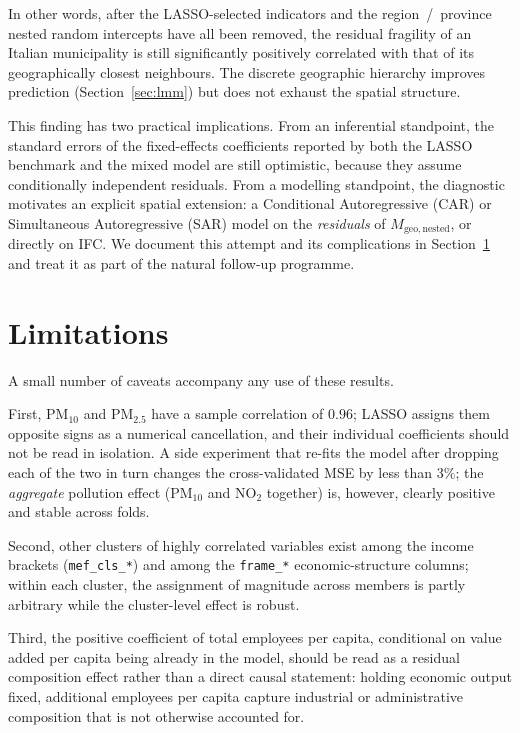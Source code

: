 \documentclass[11pt,a4paper]{article}
\begin{document}
In other words, after the LASSO-selected indicators and the
region~/~province nested random intercepts have all been removed, the
residual fragility of an Italian municipality is still significantly
positively correlated with that of its geographically closest
neighbours. The discrete geographic hierarchy improves prediction
(Section~\ref{sec:lmm}) but does not exhaust the spatial structure.

This finding has two practical implications. From an inferential
standpoint, the standard errors of the fixed-effects coefficients
reported by both the LASSO benchmark and the mixed model are still
optimistic, because they assume conditionally independent residuals.
From a modelling standpoint, the diagnostic motivates an explicit
spatial extension: a Conditional Autoregressive (CAR) or Simultaneous
Autoregressive (SAR) model on the \emph{residuals} of
\(M_{\mathrm{geo,nested}}\), or directly on IFC. We document this
attempt and its complications in Section~\ref{sec:limits} and treat
it as part of the natural follow-up programme.

\section{Limitations}
\label{sec:limits}

A small number of caveats accompany any use of these results.

First, \(\mathrm{PM}_{10}\) and \(\mathrm{PM}_{2.5}\) have a sample
correlation of \(0.96\); LASSO assigns them opposite signs as a
numerical cancellation, and their individual coefficients should not
be read in isolation. A side experiment that re-fits the model after
dropping each of the two in turn changes the cross-validated MSE by
less than \(3\%\); the \emph{aggregate} pollution effect
(\(\mathrm{PM}_{10}\) and \(\mathrm{NO}_{2}\) together) is, however,
clearly positive and stable across folds.

Second, other clusters of highly correlated variables exist among the
income brackets (\texttt{mef\_cls\_*}) and among the \texttt{frame\_*}
economic-structure columns; within each cluster, the assignment of
magnitude across members is partly arbitrary while the cluster-level
effect is robust.

Third, the positive coefficient of total employees per capita,
conditional on value added per capita being already in the model,
should be read as a residual composition effect rather than a direct
causal statement: holding economic output fixed, additional employees
per capita capture industrial or administrative composition that is
not otherwise accounted for.
\end{document}
